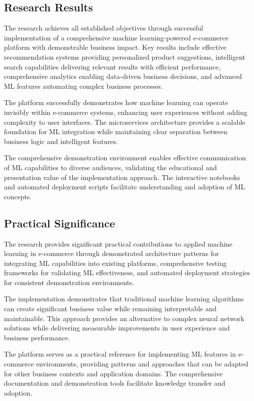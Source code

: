 \documentclass[12pt]{article}
\begin{document}
\subsection{Research Results}
The research achieves all established objectives through successful implementation of a comprehensive machine learning-powered e-commerce platform with demonstrable business impact. Key results include effective recommendation systems providing personalized product suggestions, intelligent search capabilities delivering relevant results with efficient performance, comprehensive analytics enabling data-driven business decisions, and advanced ML features automating complex business processes.

The platform successfully demonstrates how machine learning can operate invisibly within e-commerce systems, enhancing user experiences without adding complexity to user interfaces. The microservices architecture provides a scalable foundation for ML integration while maintaining clear separation between business logic and intelligent features.

The comprehensive demonstration environment enables effective communication of ML capabilities to diverse audiences, validating the educational and presentation value of the implementation approach. The interactive notebooks and automated deployment scripts facilitate understanding and adoption of ML concepts.

\subsection{Practical Significance}
The research provides significant practical contributions to applied machine learning in e-commerce through demonstrated architecture patterns for integrating ML capabilities into existing platforms, comprehensive testing frameworks for validating ML effectiveness, and automated deployment strategies for consistent demonstration environments.

The implementation demonstrates that traditional machine learning algorithms can create significant business value while remaining interpretable and maintainable. This approach provides an alternative to complex neural network solutions while delivering measurable improvements in user experience and business performance.

The platform serves as a practical reference for implementing ML features in e-commerce environments, providing patterns and approaches that can be adapted for other business contexts and application domains. The comprehensive documentation and demonstration tools facilitate knowledge transfer and adoption.
\end{document}
